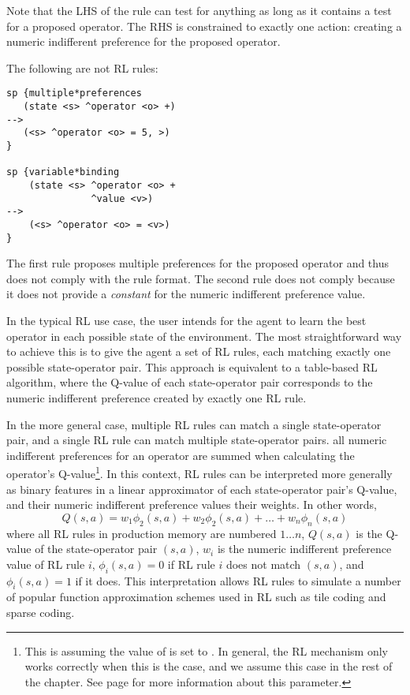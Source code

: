Note that the LHS of the rule can test for anything as long as it contains a test for a proposed operator.
The RHS is constrained to exactly one action: creating a numeric indifferent preference for the proposed operator.

The following are not RL rules:

\begin{verbatim}
sp {multiple*preferences
   (state <s> ^operator <o> +)
-->
   (<s> ^operator <o> = 5, >)
}

sp {variable*binding
    (state <s> ^operator <o> +
               ^value <v>)
-->
    (<s> ^operator <o> = <v>)
}
\end{verbatim}

The first rule proposes multiple preferences for the proposed operator and thus does not comply with the rule format.
The second rule does not comply because it does not provide a \emph{constant} for the numeric indifferent preference value.

In the typical RL use case, the user intends for the agent to learn the best operator in each possible state of the environment.
The most straightforward way to achieve this is to give the agent a set of RL rules, each matching exactly one possible state-operator pair.
This approach is equivalent to a table-based RL algorithm, where the Q-value of each state-operator pair corresponds to the numeric indifferent preference created by exactly one RL rule.

In the more general case, multiple RL rules can match a single state-operator pair, and a single RL rule can match multiple state-operator pairs.
all numeric indifferent preferences for an operator are summed when calculating the operator's Q-value\footnote{
This is assuming the value of  is set to .
In general, the RL mechanism only works correctly when this is the case, and we assume this case in the rest of the chapter.
See page \pageref{decide-numeric-indifferent-mode} for more information about this parameter.}.
In this context, RL rules can be interpreted more generally as binary features in a linear approximator of each state-operator pair's Q-value, and their numeric indifferent preference values their weights.
In other words,
$$Q(s, a) = w_1 \phi_2 (s, a) + w_2 \phi_2 (s, a) + \ldots + w_n \phi_n (s, a)$$
where all RL rules in production memory are numbered $1 \dots n$, $Q(s, a)$ is the Q-value of the state-operator pair $(s, a)$, $w_i$ is the numeric indifferent preference value of RL rule $i$, $\phi_i (s, a) = 0$ if RL rule $i$ does not match $(s, a)$, and $\phi_i (s, a) = 1$ if it does.
This interpretation allows RL rules to simulate a number of popular function approximation schemes used in RL such as tile coding and sparse coding.

